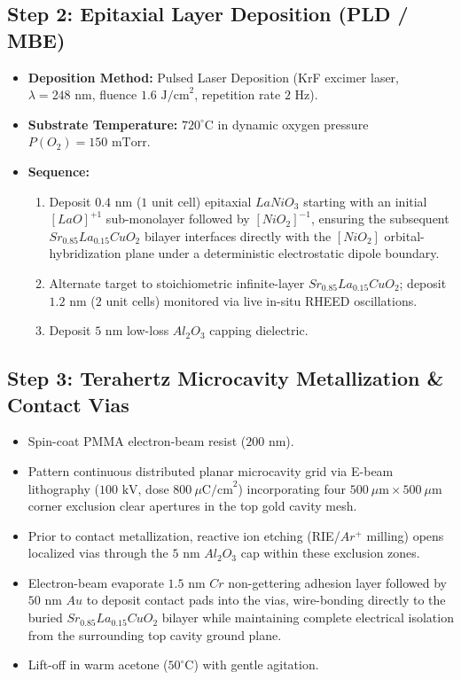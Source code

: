 \documentclass[10pt,twocolumn,letterpaper]{article}
\begin{document}
\subsection{Step 2: Epitaxial Layer Deposition (PLD / MBE)}
\begin{itemize}
    \item \textbf{Deposition Method:} Pulsed Laser Deposition (KrF excimer laser, $\lambda = 248\text{ nm}$, fluence $1.6\text{ J/cm}^2$, repetition rate $2\text{ Hz}$).
    \item \textbf{Substrate Temperature:} $720^\circ\text{C}$ in dynamic oxygen pressure $P(O_2) = 150\text{ mTorr}$.
    \item \textbf{Sequence:}
    \begin{enumerate}
        \item Deposit $0.4\text{ nm}$ ($1$ unit cell) epitaxial $LaNiO_3$ starting with an initial $[LaO]^{+1}$ sub-monolayer followed by $[NiO_2]^{-1}$, ensuring the subsequent $Sr_{0.85}La_{0.15}CuO_2$ bilayer interfaces directly with the $[NiO_2]$ orbital-hybridization plane under a deterministic electrostatic dipole boundary.
        \item Alternate target to stoichiometric infinite-layer $Sr_{0.85}La_{0.15}CuO_2$; deposit $1.2\text{ nm}$ ($2$ unit cells) monitored via live in-situ RHEED oscillations.
        \item Deposit $5\text{ nm}$ low-loss $Al_2O_3$ capping dielectric.
    \end{enumerate}
\end{itemize}

\subsection{Step 3: Terahertz Microcavity Metallization \& Contact Vias}
\begin{itemize}
    \item Spin-coat PMMA electron-beam resist ($200\text{ nm}$).
    \item Pattern continuous distributed planar microcavity grid via E-beam lithography ($100\text{ kV}$, dose $800\ \mu\text{C/cm}^2$) incorporating four $500\ \mu\text{m} \times 500\ \mu\text{m}$ corner exclusion clear apertures in the top gold cavity mesh.
    \item Prior to contact metallization, reactive ion etching (RIE/$Ar^+$ milling) opens localized vias through the $5\text{ nm } Al_2O_3$ cap within these exclusion zones.
    \item Electron-beam evaporate $1.5\text{ nm } Cr$ non-gettering adhesion layer followed by $50\text{ nm } Au$ to deposit contact pads into the vias, wire-bonding directly to the buried $Sr_{0.85}La_{0.15}CuO_2$ bilayer while maintaining complete electrical isolation from the surrounding top cavity ground plane.
    \item Lift-off in warm acetone ($50^\circ\text{C}$) with gentle agitation.
\end{itemize}
\end{document}
